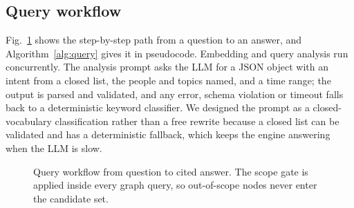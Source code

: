 \documentclass[12pt,onecolumn,draftclsnofoot]{IEEEtran}
\begin{document}
\subsection{Query workflow}
Fig.~\ref{fig:flow} shows the step-by-step path from a question to an answer, and Algorithm~\ref{alg:query} gives it in pseudocode. Embedding and query analysis run concurrently. The analysis prompt asks the LLM for a JSON object with an intent from a closed list, the people and topics named, and a time range; the output is parsed and validated, and any error, schema violation or timeout falls back to a deterministic keyword classifier. We designed the prompt as a closed-vocabulary classification rather than a free rewrite because a closed list can be validated and has a deterministic fallback, which keeps the engine answering when the LLM is slow.

\begin{figure}[t]
\centering
{}
\caption{Query workflow from question to cited answer. The scope gate is applied inside every graph query, so out-of-scope nodes never enter the candidate set.}
\label{fig:flow}
\end{figure}
\end{document}
